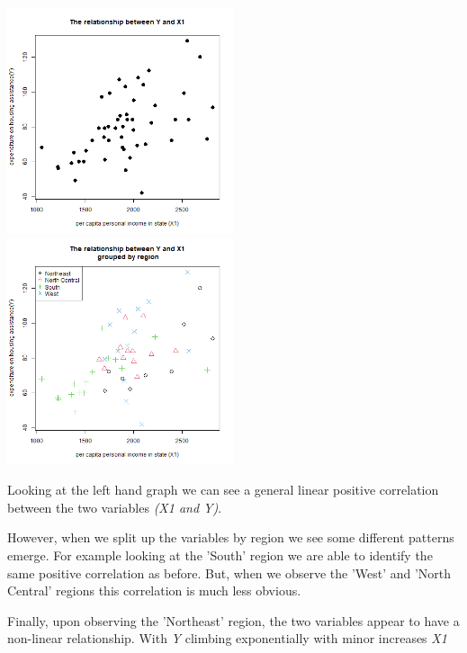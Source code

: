 \documentclass[12pt,letterpaper]{article}
\begin{document}
\begin{itemize}
\includegraphics[width=0.5\textwidth]{images/Y_against_X1.png}
\includegraphics[width=0.5\textwidth]{images/Y_against_X1_with_legend.png}


Looking at the left hand graph we can see a general linear positive correlation between the two variables \textit{(X1 and Y)}.

However, when we split up the variables by region we see some different patterns emerge. For example looking at the 'South' region we are able to identify the same positive correlation as before. But, when we observe the 'West' and 'North Central' regions this correlation is much less obvious.

Finally, upon observing the 'Northeast' region, the two variables appear to have a non-linear relationship. With \textit{Y} climbing exponentially with minor increases \textit{X1}
\end{itemize}
\end{document}
